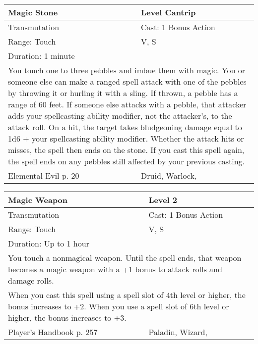 \documentclass[11pt]{report}
\begin{document}
\begin{table}[H]
	\begin{tabular}{||p{6cm}|p{6cm}||}
		\hline\hline
		\bf{Magic Stone} & Level Cantrip\\ \hline
		Transmutation & Cast: 1 Bonus Action\\ \hline
		Range: Touch & V, S\\ \hline
		Duration: 1 minute & \\ \hline
		\multicolumn{2}{||p{12cm}||}{You touch one to three pebbles and imbue them with magic. You or someone else can make a ranged spell attack with one of the pebbles by throwing it or hurling it with a sling. If thrown, a pebble has a range of 60 feet. If someone else attacks with a pebble, that attacker adds your spellcasting ability modifier, not the attacker’s, to the attack roll. On a hit, the target takes bludgeoning damage equal to 1d6 + your spellcasting ability modifier. Whether the attack hits or misses, the spell then ends on the stone.
If you cast this spell again, the spell ends on any pebbles still affected by your previous casting.}\\ \hline
Elemental Evil p. 20 & Druid, Warlock, \\ \hline\hline
	\end{tabular}
\end{table}

\begin{table}[H]
	\begin{tabular}{||p{6cm}|p{6cm}||}
		\hline\hline
		\bf{Magic Weapon} & Level 2\\ \hline
		Transmutation & Cast: 1 Bonus Action\\ \hline
		Range: Touch & V, S\\ \hline
		Duration: Up to 1 hour & \\ \hline
		\multicolumn{2}{||p{12cm}||}{You touch a nonmagical weapon. Until the spell ends, that weapon becomes a magic weapon with a +1 bonus to attack rolls and damage rolls.}\\ \hline
		\multicolumn{2}{||p{12cm}||}{When you cast this spell using a spell slot of 4th level or higher, the bonus increases to +2.
When you use a spell slot of 6th level or higher, the bonus increases to +3.}\\ \hline
Player's Handbook p. 257 & Paladin, Wizard, \\ \hline\hline
	\end{tabular}
\end{table}
\end{document}
